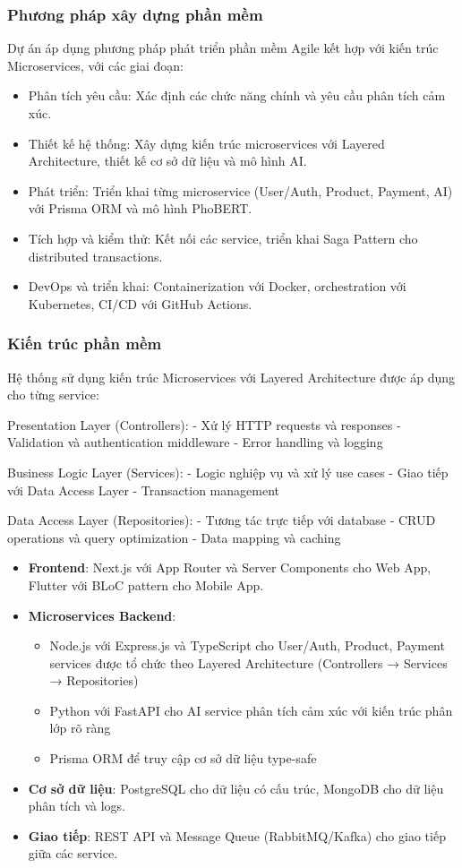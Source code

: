 \subsubsection{Phương pháp xây dựng phần mềm}
Dự án áp dụng phương pháp phát triển phần mềm Agile kết hợp với kiến trúc Microservices, với các giai đoạn:
\begin{itemize}
    \item Phân tích yêu cầu: Xác định các chức năng chính và yêu cầu phân tích cảm xúc.
    \item Thiết kế hệ thống: Xây dựng kiến trúc microservices với Layered Architecture, thiết kế cơ sở dữ liệu và mô hình AI.
    \item Phát triển: Triển khai từng microservice (User/Auth, Product, Payment, AI) với Prisma ORM và mô hình PhoBERT.
    \item Tích hợp và kiểm thử: Kết nối các service, triển khai Saga Pattern cho distributed transactions.
    \item DevOps và triển khai: Containerization với Docker, orchestration với Kubernetes, CI/CD với GitHub Actions.
\end{itemize}

\subsubsection{Kiến trúc phần mềm}
Hệ thống sử dụng kiến trúc Microservices với Layered Architecture được áp dụng cho từng service:

Presentation Layer (Controllers):
- Xử lý HTTP requests và responses
- Validation và authentication middleware
- Error handling và logging

Business Logic Layer (Services):
- Logic nghiệp vụ và xử lý use cases
- Giao tiếp với Data Access Layer
- Transaction management

Data Access Layer (Repositories):
- Tương tác trực tiếp với database
- CRUD operations và query optimization
- Data mapping và caching

\begin{itemize}
    \item \textbf{Frontend}: Next.js với App Router và Server Components cho Web App, Flutter với BLoC pattern cho Mobile App.
    \item \textbf{Microservices Backend}:
    \begin{itemize}
        \item Node.js với Express.js và TypeScript cho User/Auth, Product, Payment services được tổ chức theo Layered Architecture (Controllers → Services → Repositories)
        \item Python với FastAPI cho AI service phân tích cảm xúc với kiến trúc phân lớp rõ ràng
        \item Prisma ORM để truy cập cơ sở dữ liệu type-safe
    \end{itemize}
    \item \textbf{Cơ sở dữ liệu}: PostgreSQL cho dữ liệu có cấu trúc, MongoDB cho dữ liệu phân tích và logs.
    \item \textbf{Giao tiếp}: REST API và Message Queue (RabbitMQ/Kafka) cho giao tiếp giữa các service.
\end{itemize}

